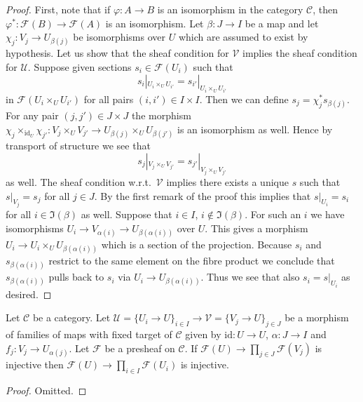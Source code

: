 \begin{proof}
First, note that if $\varphi : A \to B$ is an isomorphism in the
category $\mathcal{C}$, then $\varphi^* : \mathcal{F}(B) \to \mathcal{F}(A)$
is an isomorphism. Let $\beta : J \to I$ be a map and let
$\chi_j : V_j \to U_{\beta(j)}$ be isomorphisms over $U$ which
are assumed to exist by hypothesis. Let us show that the sheaf
condition for $\mathcal{V}$ implies the sheaf condition for $\mathcal{U}$.
Suppose given sections $s_i \in \mathcal{F}(U_i)$ such that
$$
s_i|_{U_i \times_U U_{i'}} = s_{i'}|_{U_i \times_U U_{i'}}
$$
in $\mathcal{F}(U_i \times_U U_{i'})$ for all pairs $(i, i') \in I \times I$.
Then we can define $s_j = \chi_j^*s_{\beta(j)}$. For any pair
$(j, j') \in J \times J$ the morphism
$\chi_j \times_{\text{id}_U} \chi_{j'} : V_j \times_U V_{j'} \to
U_{\beta(j)} \times_U U_{\beta(j')}$ is an isomorphism as well.
Hence by transport of structure we see that
$$
s_j|_{V_j \times_U V_{j'}} = s_{j'}|_{V_j \times_U V_{j'}}
$$
as well. The sheaf condition w.r.t.\ $\mathcal{V}$ implies there
exists a unique $s$ such that $s|_{V_j} = s_j$ for all $j \in J$.
By the first remark of the proof this implies that $s|_{U_i} = s_i$
for all $i \in \Im(\beta)$ as well. Suppose that $i \in I$,
$i \not \in \Im(\beta)$. For such an $i$ we have isomorphisms
$U_i \to V_{\alpha(i)} \to U_{\beta(\alpha(i))}$ over $U$. This gives a
morphism $U_i \to U_i \times_U U_{\beta(\alpha(i))}$ which is a
section of the projection. Because $s_i$ and $s_{\beta(\alpha(i))}$
restrict to the same element on the fibre product we conclude that
$s_{\beta(\alpha(i))}$ pulls back to $s_i$ via $U_i \to U_{\beta(\alpha(i))}$.
Thus we see that also $s_i = s|_{U_i}$ as desired.
\end{proof}

\begin{lemma}
\label{lemma-compare-separated-presheaf-condition}
Let $\mathcal{C}$ be a category. Let $\mathcal{U} = \{U_i \to U\}_{i \in I} \to
\mathcal{V} = \{V_j \to U\}_{j \in J}$ be a morphism of families of maps
with fixed target of $\mathcal{C}$ given by $\text{id} : U \to U$,
$\alpha : J \to I$ and $f_j : V_j \to U_{\alpha(j)}$. Let $\mathcal{F}$
be a presheaf on $\mathcal{C}$. If
$\mathcal{F}(U) \to \prod_{j \in J} \mathcal{F}(V_j)$ is
injective then
$\mathcal{F}(U) \to \prod_{i \in I} \mathcal{F}(U_i)$ is
injective.
\end{lemma}

\begin{proof}
Omitted.
\end{proof}

